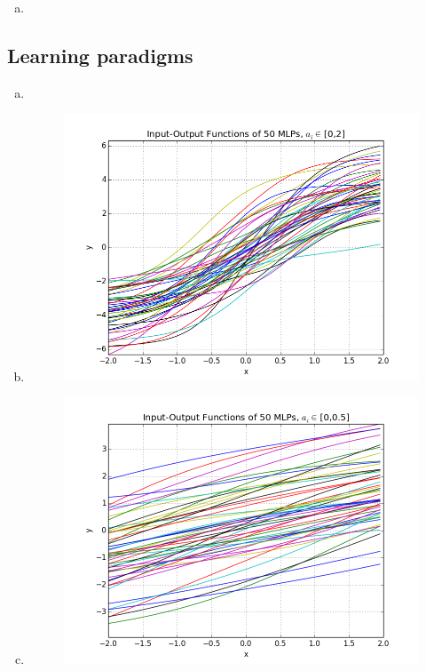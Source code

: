 \documentclass[11pt,a4paper]{article}
\begin{document}
\begin{enumerate}[a)]
\item


\end{enumerate}
\subsection{Learning paradigms}

\begin{enumerate}[a)]
\item

\item
\begin{figure}[h]
  \centering
  \includegraphics[width=13 cm]{23b.png}
  \label{23b}
\end{figure}


\item
\begin{figure}[h]
  \centering
  \includegraphics[width=13 cm]{23c.png}
  \label{23c}
\end{figure}


\end{enumerate}
\end{document}
